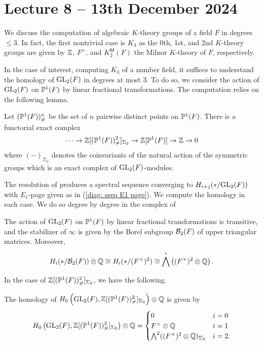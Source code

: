 \section{Lecture 8 -- 13th December 2024}\label{sec: lecture 8}
We discuss the computation of algebraic $K$-theory groups of a field $F$ in degrees $\leq 3$. In fact, the first nontrivial case is $K_{3}$ as the 0th, 1st, and 2nd $K$-theory groups are given by $\mathbb{Z}$, $F^{\times}$, and $K^{\mathsf{M}}_{2}(F)$ the Milnor $K$-theory of $F$, respectively. 

In the case of interest, computing $K_{3}$ of a number field, it suffiecs to understand the homology of $\mathrm{GL}_{2}(F)$ in degrees at most 3. To do so, we consider the action of $\mathrm{GL}_{2}(F)$ on $\mathbb{P}^{1}(F)$ by linear fractional transformations. The computation relies on the following lemma. 
\begin{proposition}\label{prop: resolutions by free Abelian groups}
    Let $(\mathbb{P}^{1}(F))^{n}_{\neq}$ be the set of $n$ pairwise distinct points on $\mathbb{P}^{1}(F)$. There is a functorial exact complex 
    $$\dots\to\mathbb{Z}[(\mathbb{P}^{1}(F))^{2}_{\neq}]_{\Sigma_{2}}\to\mathbb{Z}[\mathbb{P}^{1}(F)]\to\mathbb{Z}\to0$$
    where $(-)_{\Sigma_{n}}$ denotes the coinvariants of the natural action of the symmetric groups which is an exact complex of $\mathrm{GL}_{2}(F)$-modules. 
\end{proposition}
The resolution of  produces a spectral sequence converging to $H_{i+j}(*/\mathrm{GL}_{2}(F))$ with $E_{1}$-page given as in (\ref{diag: sseq E1 page}). We compute the homology in each case. We do so degree by degree in the complex of 
\begin{proposition}\label{prop: action on P1}
    The action of $\mathrm{GL}_{2}(F)$ on $\mathbb{P}^{1}(F)$ by linear fractional transformations is transitive, and the stabilizer of $\infty$ is given by the Borel subgroup $\mathcal{B}_{2}(F)$ of upper triangular matrices. Moreover, 
    $$H_{i}(*/\mathcal{B}_{2}(F))\otimes\mathbb{Q}\cong H_{i}(*/(F^{\times})^{2})\cong\bigwedge^{i}\left((F^{\times})^{2}\otimes\mathbb{Q}\right).$$
\end{proposition}
In the case of $\mathbb{Z}[(\mathbb{P}^{1}(F))^{2}_{\neq}]_{\Sigma_{2}}$, we have the following. 
\begin{proposition}\label{prop: action on P1 2}
    The homology of $H_{0}\left(\mathrm{GL}_{2}(F),\mathbb{Z}[(\mathbb{P}^{1}(F))^{2}_{\neq}]_{\Sigma_{2}}\right)\otimes\mathbb{Q}$ is given by 
    $$H_{0}\left(\mathrm{GL}_{2}(F),\mathbb{Z}[(\mathbb{P}^{1}(F))^{2}_{\neq}]_{\Sigma_{2}}\right)\otimes\mathbb{Q}=\begin{cases}
        0 & i = 0 \\ F^{\times}\otimes\mathbb{Q} & i=1 \\ \bigwedge^{2}((F^{\times})^{2}\otimes\mathbb{Q})_{\Sigma_{2}} & i=2.
    \end{cases}$$
\end{proposition}
